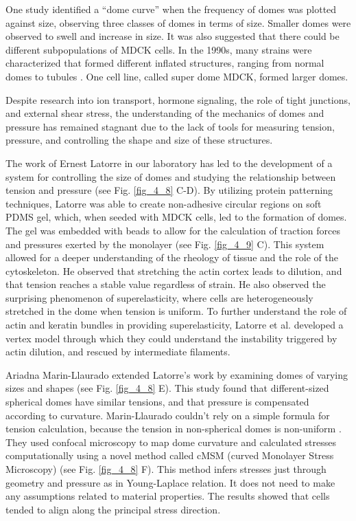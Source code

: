 One study \cite{popowicz1986} identified a ``dome curve'' when the frequency of domes was plotted against size, observing three classes of domes in terms of size. Smaller domes were observed to swell and increase in size. It was also suggested that there could be different subpopulations of MDCK cells. In the 1990s, many strains were characterized that formed different inflated structures, ranging from normal domes to tubules \cite{klebe1995}. One cell line, called super dome MDCK, formed larger domes.

Despite research into ion transport, hormone signaling, the role of tight junctions, and external shear stress, the understanding of the mechanics of domes and pressure has remained stagnant due to the lack of tools for measuring tension, pressure, and controlling the shape and size of these structures.

The work of Ernest Latorre in our laboratory has led to the development of a system for controlling the size of domes and studying the relationship between tension and pressure \cite{latorre2018} (see Fig. \ref{fig_4_8} C-D). By utilizing protein patterning techniques, Latorre was able to create non-adhesive circular regions on soft PDMS gel, which, when seeded with MDCK cells, led to the formation of domes. The gel was embedded with beads to allow for the calculation of traction forces and pressures exerted by the monolayer (see  Fig. \ref{fig_4_9} C). This system allowed for a deeper understanding of the rheology of tissue and the role of the cytoskeleton. He observed that stretching the actin cortex leads to dilution, and that tension reaches a stable value regardless of strain. He also observed the surprising phenomenon of superelasticity, where cells are heterogeneously stretched in the dome when tension is uniform. To further understand the role of actin and keratin bundles in providing superelasticity, Latorre et al. developed a vertex model through which they could understand the instability triggered by actin dilution, and rescued by intermediate filaments.

Ariadna Marin-Llaurado extended Latorre's work by examining domes of varying sizes and shapes (see Fig. \ref{fig_4_8} E). This study found that different-sized spherical domes have similar tensions, and that pressure is compensated according to curvature. Marin-Llaurado couldn't rely on a simple formula for tension calculation, because the tension in non-spherical domes is non-uniform \cite{marin-llaurado2022}. They used confocal microscopy to map dome curvature and calculated stresses computationally using a novel method called cMSM (curved Monolayer Stress Microscopy) (see Fig. \ref{fig_4_8} F). This method infers stresses just through geometry and pressure as in Young-Laplace relation. It does not need to make any assumptions related to material properties. The results showed that cells tended to align along the principal stress direction.


